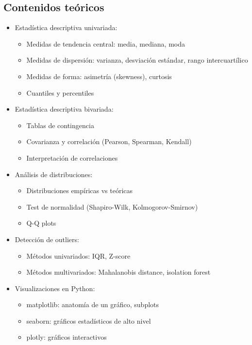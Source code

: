\documentclass[a4paper,11pt]{article}
\begin{document}
\subsection{Contenidos teóricos}
\begin{itemize}[leftmargin=*]
    \item Estadística descriptiva univariada:
    \begin{itemize}
        \item Medidas de tendencia central: media, mediana, moda
        \item Medidas de dispersión: varianza, desviación estándar, rango intercuartílico
        \item Medidas de forma: asimetría (skewness), curtosis
        \item Cuantiles y percentiles
    \end{itemize}
    \item Estadística descriptiva bivariada:
    \begin{itemize}
        \item Tablas de contingencia
        \item Covarianza y correlación (Pearson, Spearman, Kendall)
        \item Interpretación de correlaciones
    \end{itemize}
    \item Análisis de distribuciones:
    \begin{itemize}
        \item Distribuciones empíricas vs teóricas
        \item Test de normalidad (Shapiro-Wilk, Kolmogorov-Smirnov)
        \item Q-Q plots
    \end{itemize}
    \item Detección de outliers:
    \begin{itemize}
        \item Métodos univariados: IQR, Z-score
        \item Métodos multivariados: Mahalanobis distance, isolation forest
    \end{itemize}
    \item Visualizaciones en Python:
    \begin{itemize}
        \item matplotlib: anatomía de un gráfico, subplots
        \item seaborn: gráficos estadísticos de alto nivel
        \item plotly: gráficos interactivos

\end{itemize}
\end{itemize}
\end{document}
